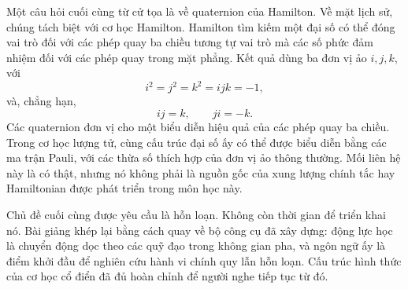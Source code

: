 Một câu hỏi cuối cùng từ cử tọa là về quaternion của Hamilton. Về mặt lịch sử, chúng tách biệt với cơ học Hamilton. Hamilton tìm kiếm một đại số có thể đóng vai trò đối với các phép quay ba chiều tương tự vai trò mà các số phức đảm nhiệm đối với các phép quay trong mặt phẳng. Kết quả dùng ba đơn vị ảo \(i,j,k\), với
\begin{equation}
  i^2=j^2=k^2=ijk=-1,
\end{equation}
và, chẳng hạn,
\begin{equation}
  ij=k,
  \qquad
  ji=-k.
\end{equation}
Các quaternion đơn vị cho một biểu diễn hiệu quả của các phép quay ba chiều. Trong cơ học lượng tử, cùng cấu trúc đại số ấy có thể được biểu diễn bằng các ma trận Pauli, với các thừa số thích hợp của đơn vị ảo thông thường. Mối liên hệ này là có thật, nhưng nó không phải là nguồn gốc của xung lượng chính tắc hay Hamiltonian được phát triển trong môn học này.

Chủ đề cuối cùng được yêu cầu là hỗn loạn. Không còn thời gian để triển khai nó. Bài giảng khép lại bằng cách quay về bộ công cụ đã xây dựng: động lực học là chuyển động dọc theo các quỹ đạo trong không gian pha, và ngôn ngữ ấy là điểm khởi đầu để nghiên cứu hành vi chính quy lẫn hỗn loạn. Cấu trúc hình thức của cơ học cổ điển đã đủ hoàn chỉnh để người nghe tiếp tục từ đó.
